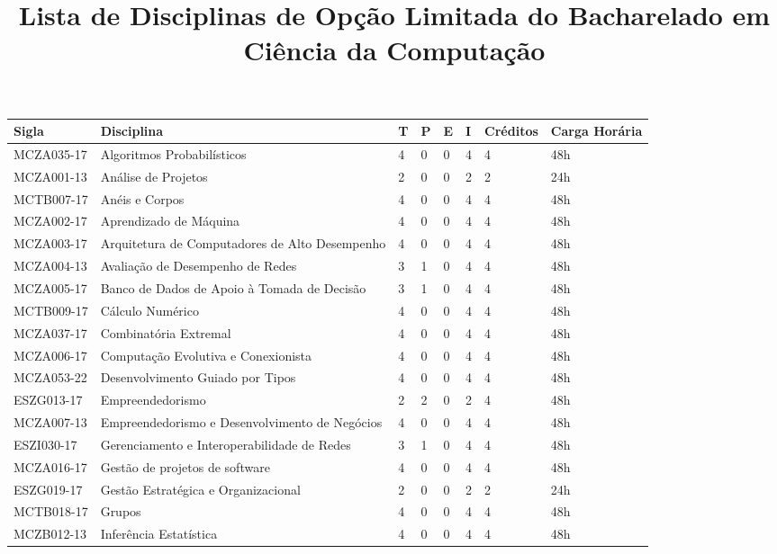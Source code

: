 \documentclass[a4paper]{article}
\title{Lista de Disciplinas de Opção Limitada do Bacharelado em Ciência da Computação}
\author{}
\date{}
\begin{document}
\maketitle

\begin{longtable}{|l|l|llll|l|l|}\hline\endhead\hline\endfoot
\textbf{Sigla} & \textbf{Disciplina} & \textbf{T} & \textbf{P} & \textbf{E} & \textbf{I} & \textbf{Créditos} & \textbf{Carga Horária} \\ \hline\hline
%
MCZA035-17 & Algoritmos Probabilísticos & 4 & 0 & 0 & 4 & 4 & 48h \\
MCZA001-13 & Análise de Projetos & 2 & 0 & 0 & 2 & 2 & 24h \\
MCTB007-17 & Anéis e Corpos & 4 & 0 & 0 & 4 & 4 & 48h \\
MCZA002-17 & Aprendizado de Máquina & 4 & 0 & 0 & 4 & 4 & 48h \\
MCZA003-17 & Arquitetura de Computadores de Alto Desempenho & 4 & 0 & 0 & 4 & 4 & 48h \\
MCZA004-13 & Avaliação de Desempenho de Redes & 3 & 1 & 0 & 4 & 4 & 48h \\
MCZA005-17 & Banco de Dados de Apoio à Tomada de Decisão & 3 & 1 & 0 & 4 & 4 & 48h \\
MCTB009-17 & Cálculo Numérico & 4 & 0 & 0 & 4 & 4 & 48h \\
MCZA037-17 & Combinatória Extremal & 4 & 0 & 0 & 4 & 4 & 48h \\
MCZA006-17 & Computação Evolutiva e Conexionista & 4 & 0 & 0 & 4 & 4 & 48h \\
MCZA053-22 & Desenvolvimento Guiado por Tipos & 4 & 0 & 0 & 4 & 4 & 48h \\
ESZG013-17 & Empreendedorismo & 2 & 2 & 0 & 2 & 4 & 48h \\
MCZA007-13 & Empreendedorismo e Desenvolvimento de Negócios & 4 & 0 & 0 & 4 & 4 & 48h \\
ESZI030-17 & Gerenciamento e Interoperabilidade de Redes & 3 & 1 & 0 & 4 & 4 & 48h \\
MCZA016-17 & Gestão de projetos de software & 4 & 0 & 0 & 4 & 4 & 48h \\
ESZG019-17 & Gestão Estratégica e Organizacional & 2 & 0 & 0 & 2 & 2 & 24h \\
MCTB018-17 & Grupos & 4 & 0 & 0 & 4 & 4 & 48h \\
MCZB012-13 & Inferência Estatística & 4 & 0 & 0 & 4 & 4 & 48h \\

\end{longtable}
\end{document}
